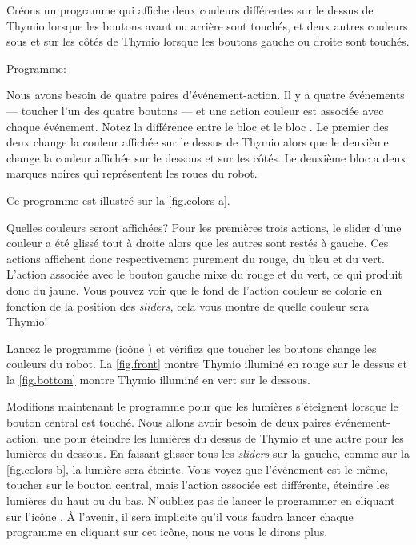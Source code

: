 

Créons un programme qui affiche deux couleurs différentes sur le dessus de Thymio lorsque les boutons avant ou arrière sont touchés, et deux autres couleurs sous et sur les côtés de Thymio lorsque les boutons gauche ou droite sont touchés.

{\raggedleft \hfill Programme: }

Nous avons besoin de quatre paires d'événement-action.
Il y a quatre événements --- toucher l'un des quatre boutons --- et une action couleur est associée avec chaque événement.
Notez la différence entre le bloc  et le bloc . Le premier des deux change la couleur affichée sur le dessus de Thymio alors que le deuxième change la couleur affichée sur le dessous et sur les côtés. Le deuxième bloc a deux marques noires qui représentent les roues du robot.

Ce programme est illustré sur la \cref{fig.colors-a}.

Quelles couleurs seront affichées? Pour les premières trois actions, le slider d'une couleur a été glissé tout à droite alors que les autres sont restés à gauche.
Ces actions affichent donc respectivement purement du rouge, du bleu et du vert.
L'action associée avec le bouton gauche mixe du rouge et du vert, ce qui produit donc du jaune.
Vous pouvez voir que le fond de l'action couleur se colorie en fonction de la position des \textit{sliders}, cela vous montre de quelle couleur sera Thymio!

Lancez le programme (icône ) et vérifiez que toucher les boutons change les couleurs du robot.
La \cref{fig.front} montre Thymio illuminé en rouge sur le dessus et la \cref{fig.bottom} montre Thymio illuminé en vert sur le dessous.




Modifions maintenant le programme pour que les lumières s'éteignent lorsque le bouton central est touché. Nous allons avoir besoin de deux paires événement-action, une pour éteindre les lumières du dessus de Thymio et une autre pour les lumières du dessous. En faisant glisser tous les \textit{sliders} sur la gauche, comme sur la \cref{fig.colors-b}, la lumière sera éteinte.
Vous voyez que l'événement est le même, toucher sur le bouton central, mais l'action associée est différente, éteindre les lumières du haut ou du bas.
N'oubliez pas de lancer le programmer en cliquant sur l'icône .
À l'avenir, il sera implicite qu'il vous faudra lancer chaque programme en cliquant sur cet icône, nous ne vous le dirons plus.

